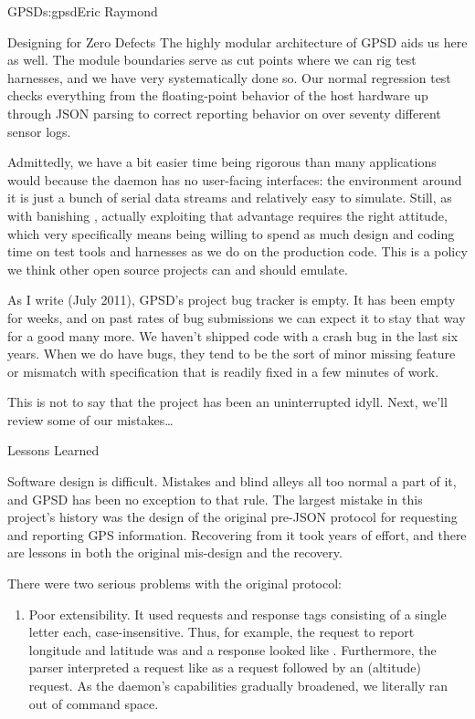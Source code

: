 \begin{aosachapter}{GPSD}{s:gpsd}{Eric Raymond}
\begin{aosasect1}{Designing for Zero Defects}
The highly modular architecture of GPSD aids us here as well. The
module boundaries serve as cut points where we can rig test harnesses,
and we have very systematically done so.  Our normal regression test
checks everything from the floating-point behavior of the host
hardware up through JSON parsing to correct reporting behavior on over
seventy different sensor logs.

Admittedly, we have a bit easier time being rigorous than many
applications would because the daemon has no user-facing interfaces:
the environment around it is just a bunch of serial data streams and
relatively easy to simulate.  Still, as with banishing ,
actually exploiting that advantage requires the right attitude, which
very specifically means being willing to spend as much design and
coding time on test tools and harnesses as we do on the production
code.  This is a policy we think other open source projects can and
should emulate.

As I write (July 2011), GPSD's project bug tracker is empty.  It has
been empty for weeks, and on past rates of bug submissions we can
expect it to stay that way for a good many more.  We haven't shipped
code with a crash bug in the last six years.  When we do have bugs,
they tend to be the sort of minor missing feature or mismatch with
specification that is readily fixed in a few minutes of work.

This is not to say that the project has been an uninterrupted idyll.  
Next, we'll review some of our mistakes{\ldots}

\end{aosasect1}

\begin{aosasect1}{Lessons Learned}

Software design is difficult.  Mistakes and blind alleys all too
normal a part of it, and GPSD has been no exception to that rule.  The
largest mistake in this project's history was the design of the
original pre-JSON protocol for requesting and reporting GPS
information.  Recovering from it took years of effort, and there are
lessons in both the original mis-design and the recovery.

There were two serious problems with the original protocol:

\begin{enumerate}

  \item Poor extensibility.  It used requests and response tags
    consisting of a single letter each, case-insensitive. Thus, for
    example, the request to report longitude and latitude was
     and a response looked like . Furthermore, the parser interpreted a request like
     as a  request followed by an 
    (altitude) request.  As the daemon's capabilities gradually
    broadened, we literally ran out of command space.


\end{enumerate}
\end{aosasect1}
\end{aosachapter}
